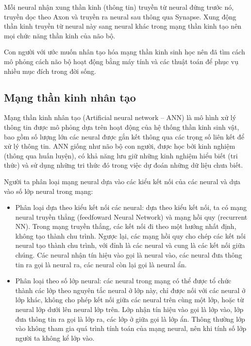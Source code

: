 Mỗi neural nhận xung thần kinh (thông tin) truyền từ neural đứng trước nó, truyền dọc theo Axon và truyền ra neural sau thông qua Synapse. Xung động thần kinh truyền từ neural này sang neural khác trong mạng thần kinh tạo nên mọi chức năng thần kinh của não bộ.

\vspace{\baselineskip}
Con người với ước muốn nhân tạo hóa mạng thần kinh sinh học nên đã tìm cách mô phỏng cách não bộ hoạt động bằng máy tính và các thuật toán để phục vụ nhiều mục đích trong đời sống.

\subsection{Mạng thần kinh nhân tạo}
Mạng thần kinh nhân tạo (Artificial neural network – ANN) là mô hình xử lý thông tin được mô phỏng dựa trên hoạt động của hệ thống thần kinh sinh vật, bao gồm số lượng lớn các neural được gắn kết thông qua các trọng số liên kết để xử lý thông tin. ANN giống như não bộ con người, được học bởi kinh nghiệm (thông qua huấn luyện), có khả năng lưu giữ những kinh nghiệm hiểu biết (tri thức) và sử dụng những tri thức đó trong việc dự đoán những dữ liệu chưa biết.
 
\vspace{\baselineskip}
Người ta phân loại mạng neural dựa vào các kiểu kết nối của các neural và dựa vào số lớp neural trong mạng:

\begin{itemize}
	\item Phân loại dựa theo kiểu kết nối các neural: dựa theo kiểu kết nối, ta có mạng neural truyền thẳng (feedfoward Neural Network) và mạng hồi quy (recurrent NN). Trong mạng truyền thẳng, các kết nối đi theo một hướng nhất định, không tạo thành chu trình. Ngược lại, các mạng hồi quy cho chép các kết nối neural tạo thành chu trình, với đỉnh là các neural và cung là các kết nối giữa chúng. Các neural nhận tín hiệu vào gọi là neural vào, các neural đưa thông tin ra gọi là neural ra, các neural còn lại gọi là neural ẩn.
	\item Phân loại theo số lớp neural: các neural trong mạng có thể được tổ chức thành các lớp theo nguyên tắc neural ở lớp này, chỉ được nối với các neural ở lớp khác, không cho phép kết nối giữa các neural trên cùng một lớp, hoặc từ neural lớp dưới lên neural lớp trên. Lớp nhận tín hiệu vào gọi là lớp vào, lớp đưa thông tin ra gọi là lớp ra, các lớp ở giữa gọi là lớp ẩn. Thông thường lớp vào không tham gia quá trình tính toán của mạng neural, nên khi tính số lớp người ta không kể lớp vào.
\end{itemize}

